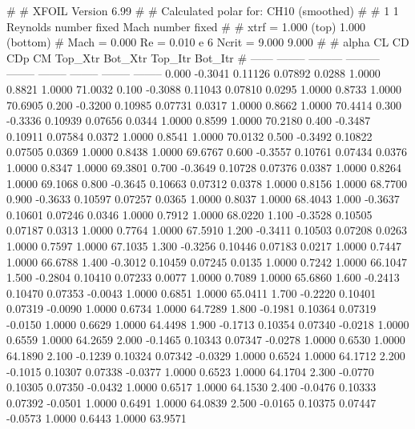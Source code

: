 #  
#       XFOIL         Version 6.99
#  
# Calculated polar for: CH10 (smoothed)                                 
#  
# 1 1 Reynolds number fixed          Mach number fixed         
#  
# xtrf =   1.000 (top)        1.000 (bottom)  
# Mach =   0.000     Re =     0.010 e 6     Ncrit =   9.000  9.000
#  
#   alpha    CL        CD       CDp       CM     Top_Xtr  Bot_Xtr  Top_Itr  Bot_Itr
#  ------ -------- --------- --------- -------- -------- -------- -------- --------
   0.000  -0.3041   0.11126   0.07892   0.0288   1.0000   0.8821   1.0000  71.0032
   0.100  -0.3088   0.11043   0.07810   0.0295   1.0000   0.8733   1.0000  70.6905
   0.200  -0.3200   0.10985   0.07731   0.0317   1.0000   0.8662   1.0000  70.4414
   0.300  -0.3336   0.10939   0.07656   0.0344   1.0000   0.8599   1.0000  70.2180
   0.400  -0.3487   0.10911   0.07584   0.0372   1.0000   0.8541   1.0000  70.0132
   0.500  -0.3492   0.10822   0.07505   0.0369   1.0000   0.8438   1.0000  69.6767
   0.600  -0.3557   0.10761   0.07434   0.0376   1.0000   0.8347   1.0000  69.3801
   0.700  -0.3649   0.10728   0.07376   0.0387   1.0000   0.8264   1.0000  69.1068
   0.800  -0.3645   0.10663   0.07312   0.0378   1.0000   0.8156   1.0000  68.7700
   0.900  -0.3633   0.10597   0.07257   0.0365   1.0000   0.8037   1.0000  68.4043
   1.000  -0.3637   0.10601   0.07246   0.0346   1.0000   0.7912   1.0000  68.0220
   1.100  -0.3528   0.10505   0.07187   0.0313   1.0000   0.7764   1.0000  67.5910
   1.200  -0.3411   0.10503   0.07208   0.0263   1.0000   0.7597   1.0000  67.1035
   1.300  -0.3256   0.10446   0.07183   0.0217   1.0000   0.7447   1.0000  66.6788
   1.400  -0.3012   0.10459   0.07245   0.0135   1.0000   0.7242   1.0000  66.1047
   1.500  -0.2804   0.10410   0.07233   0.0077   1.0000   0.7089   1.0000  65.6860
   1.600  -0.2413   0.10470   0.07353  -0.0043   1.0000   0.6851   1.0000  65.0411
   1.700  -0.2220   0.10401   0.07319  -0.0090   1.0000   0.6734   1.0000  64.7289
   1.800  -0.1981   0.10364   0.07319  -0.0150   1.0000   0.6629   1.0000  64.4498
   1.900  -0.1713   0.10354   0.07340  -0.0218   1.0000   0.6559   1.0000  64.2659
   2.000  -0.1465   0.10343   0.07347  -0.0278   1.0000   0.6530   1.0000  64.1890
   2.100  -0.1239   0.10324   0.07342  -0.0329   1.0000   0.6524   1.0000  64.1712
   2.200  -0.1015   0.10307   0.07338  -0.0377   1.0000   0.6523   1.0000  64.1704
   2.300  -0.0770   0.10305   0.07350  -0.0432   1.0000   0.6517   1.0000  64.1530
   2.400  -0.0476   0.10333   0.07392  -0.0501   1.0000   0.6491   1.0000  64.0839
   2.500  -0.0165   0.10375   0.07447  -0.0573   1.0000   0.6443   1.0000  63.9571
